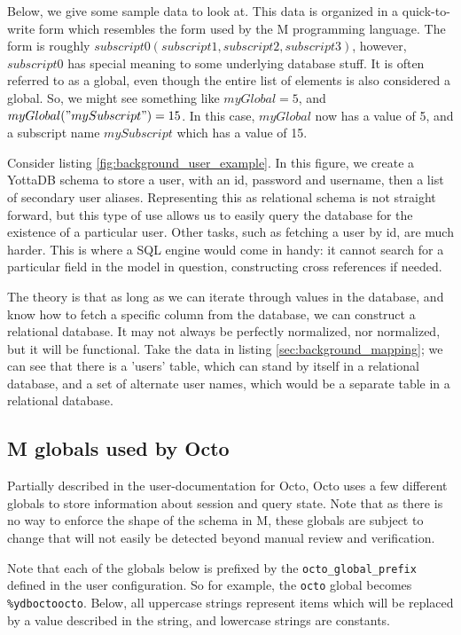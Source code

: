 \documentclass[]{article}
\def\code#1{\texttt{#1}}
\begin{document}
Below, we give some sample data to look at.
This data is organized in a quick-to-write form which resembles the form used by the M programming language.
The form is roughly $subscript0(subscript1,subscript2,subscript3)$, however, $subscript0$ has special meaning to some underlying database stuff.
It is often referred to as a global, even though the entire list of elements is also considered a global.
So, we might see something like $myGlobal=5$, and $myGlobal("mySubscript")=15$.
In this case, $myGlobal$ now has a value of 5, and a subscript name $mySubscript$ which has a value of 15.

Consider listing \ref{fig:background_user_example}.
In this figure, we create a YottaDB schema to store a user, with an id, password and username, then a list of secondary user aliases.
Representing this as relational schema is not straight forward, but this type of use allows us to easily query the database for the existence of a particular user.
Other tasks, such as fetching a user by id, are much harder.
This is where a SQL engine would come in handy: it cannot search for a particular field in the model in question, constructing cross references if needed.



The theory is that as long as we can iterate through values in the database, and know how to fetch a specific column from the database, we can construct a relational database.
It may not always be perfectly normalized, nor normalized, but it will be functional.
Take the data in listing \ref{sec:background_mapping}; we can see that there is a 'users' table, which can stand by itself in a relational database, and a set of alternate user names, which would be a separate table in a relational database.

\subsection{M globals used by Octo}

Partially described in the user-documentation for Octo, Octo uses a few different globals to store information about session and query state.
Note that as there is no way to enforce the shape of the schema in M, these globals are subject to change that will not easily be detected beyond manual review and verification.

Note that each of the globals below is prefixed by the \code{octo\_global\_prefix} defined in the user configuration.
So for example, the \code{octo} global becomes \code{\%ydboctoocto}.
Below, all uppercase strings represent items which will be replaced by a value described in the string, and lowercase strings are constants.
\end{document}
